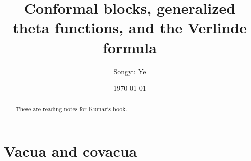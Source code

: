 \documentclass[12pt]{article}
\begin{document}
\rhead{\today}
\cfoot{\thepage}

\title{Conformal blocks, generalized theta functions, and the Verlinde formula}

\author{Songyu Ye}
\date{\today}
\maketitle


\begin{abstract}
    These are reading notes for Kumar's book.
\end{abstract}

\tableofcontents

\section{Vacua and covacua}
\end{document}
